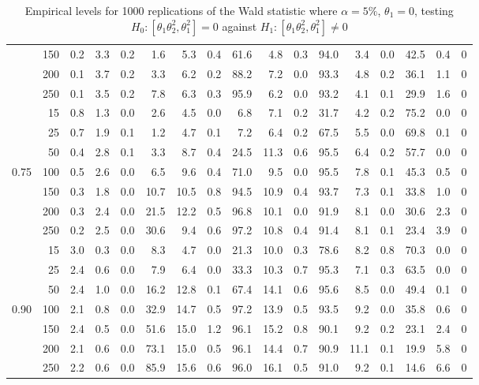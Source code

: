 \documentclass[11pt]{article}\usepackage[]{graphicx}\usepackage[]{color}
\begin{document}
\begin{table}[H]
{\begin{tabular}{|r|r|r|r|r|r|r|r|r|r|r|r|r|r|r|r|r|}
			& 150 & 0.2 & 3.3 & 0.2 & 1.6 & 5.3 & 0.4 & 61.6 & 4.8 & 0.3 & 94.0 & 3.4 & 0.0 & 42.5 & 0.4 & 0 \\
			& 200 & 0.1 & 3.7 & 0.2 & 3.3 & 6.2 & 0.2 & 88.2 & 7.2 & 0.0 & 93.3 & 4.8 & 0.2 & 36.1 & 1.1 & 0 \\
			& 250 & 0.1 & 3.5 & 0.2 & 7.8 & 6.3 & 0.3 & 95.9 & 6.2 & 0.0 & 93.2 & 4.1 & 0.1 & 29.9 & 1.6 & 0 \\
			\hline
			& 15 & 0.8 & 1.3 & 0.0 & 2.6 & 4.5 & 0.0 & 6.8 & 7.1 & 0.2 & 31.7 & 4.2 & 0.2 & 75.2 & 0.0 & 0 \\
			& 25 & 0.7 & 1.9 & 0.1 & 1.2 & 4.7 & 0.1 & 7.2 & 6.4 & 0.2 & 67.5 & 5.5 & 0.0 & 69.8 & 0.1 & 0 \\
			& 50 & 0.4 & 2.8 & 0.1 & 3.3 & 8.7 & 0.4 & 24.5 & 11.3 & 0.6 & 95.5 & 6.4 & 0.2 & 57.7 & 0.0 & 0 \\
			0.75 & 100 & 0.5 & 2.6 & 0.0 & 6.5 & 9.6 & 0.4 & 71.0 & 9.5 & 0.0 & 95.5 & 7.8 & 0.1 & 45.3 & 0.5 & 0 \\
			& 150 & 0.3 & 1.8 & 0.0 & 10.7 & 10.5 & 0.8 & 94.5 & 10.9 & 0.4 & 93.7 & 7.3 & 0.1 & 33.8 & 1.0 & 0 \\
			& 200 & 0.3 & 2.4 & 0.0 & 21.5 & 12.2 & 0.5 & 96.8 & 10.1 & 0.0 & 91.9 & 8.1 & 0.0 & 30.6 & 2.3 & 0 \\
			& 250 & 0.2 & 2.5 & 0.0 & 30.6 & 9.4 & 0.6 & 97.2 & 10.8 & 0.4 & 91.4 & 8.1 & 0.1 & 23.4 & 3.9 & 0 \\
			\hline
			& 15 & 3.0 & 0.3 & 0.0 & 8.3 & 4.7 & 0.0 & 21.3 & 10.0 & 0.3 & 78.6 & 8.2 & 0.8 & 70.3 & 0.0 & 0 \\
			& 25 & 2.4 & 0.6 & 0.0 & 7.9 & 6.4 & 0.0 & 33.3 & 10.3 & 0.7 & 95.3 & 7.1 & 0.3 & 63.5 & 0.0 & 0 \\
			& 50 & 2.4 & 1.0 & 0.0 & 16.2 & 12.8 & 0.1 & 67.4 & 14.1 & 0.6 & 95.6 & 8.5 & 0.0 & 49.4 & 0.1 & 0 \\
			0.90 & 100 & 2.1 & 0.8 & 0.0 & 32.9 & 14.7 & 0.5 & 97.2 & 13.9 & 0.5 & 93.5 & 9.2 & 0.0 & 35.8 & 0.6 & 0 \\
			& 150 & 2.4 & 0.5 & 0.0 & 51.6 & 15.0 & 1.2 & 96.1 & 15.2 & 0.8 & 90.1 & 9.2 & 0.2 & 23.1 & 2.4 & 0 \\
			& 200 & 2.1 & 0.6 & 0.0 & 73.1 & 15.0 & 0.5 & 96.1 & 14.4 & 0.7 & 90.9 & 11.1 & 0.1 & 19.9 & 5.8 & 0 \\
			& 250 & 2.2 & 0.6 & 0.0 & 85.9 & 15.6 & 0.6 & 96.0 & 16.1 & 0.5 & 91.0 & 9.2 & 0.1 & 14.6 & 6.6 & 0 \\
			\hline
		\end{tabular}
	}
	\caption{Empirical levels for 1000 replications of the Wald statistic where $\alpha = 5\%$, $\theta_1=0$, testing $H_0: \left[ \theta_1\theta_2^2, \theta_1^2\right] =0$ against $H_1: \left[ \theta_1\theta_2^2, \theta_1^2\right] \neq 0$}
	\label{tbl:W:13}
\end{table}
\end{document}
